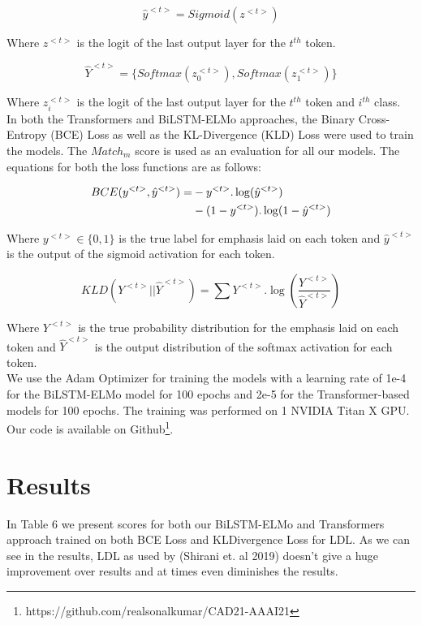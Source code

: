 \documentclass[letterpaper]{article}
\begin{document}
\begin{equation}
{\hat{y}}^{<t>} = Sigmoid(z^{<t>})
\end{equation}

Where $z^{<t>}$ is the logit of the last output layer for the $t^{th}$ token.

\begin{equation}
{\hat{Y}}^{<t>} = \{Softmax(z_{0}^{<t>}),Softmax(z_{1}^{<t>})\}
\end{equation}

Where $z^{<t>}_i$ is the logit of the last output layer for the $t^{th}$ token and $i^{th}$ class.\\

In both the Transformers and BiLSTM-ELMo approaches, the Binary Cross-Entropy (BCE) Loss as well as the KL-Divergence (KLD) Loss were used to train the models. The $Match_m$ score is used as an evaluation for all our models. The equations for both the loss functions are as follows:

\begin{align}
BCE(y^{<t>},\hat{y}^{<t>}) = &- y^{<t>}.\log(\hat{y}^{<t>})\notag \\ &- (1-y^{<t>}).\log(1-\hat{y}^{<t>})
\end{align}

Where $y^{<t>}\in\{0,1\}$ is the true label for emphasis laid on each token and $\hat{y}^{<t>}$ is the output of the sigmoid activation for each token.

\begin{equation}
KLD(Y^{<t>}||\hat{Y}^{<t>}) = \sum Y^{<t>}.\log\left(\frac{Y^{<t>}}{\hat{Y}^{<t>}}\right)
\end{equation}

Where $Y^{<t>}$ is the true probability distribution for the emphasis laid on each token and $\hat{Y}^{<t>}$ is the output distribution of the softmax activation for each token.\\

We use the Adam Optimizer for training the models with a learning rate of 1e-4 for the BiLSTM-ELMo model for 100 epochs and 2e-5 for the Transformer-based models for 100 epochs. The training was performed on 1 NVIDIA Titan X GPU. Our code is available on Github\footnote{https://github.com/realsonalkumar/CAD21-AAAI21}.
\section{Results}
In Table 6 we present scores for both our BiLSTM-ELMo and Transformers approach trained on both BCE Loss and KLDivergence Loss for LDL. As we can see in the results, LDL as used by (Shirani et. al 2019) doesn't give a huge improvement over results and at times even diminishes the results.
\end{document}
